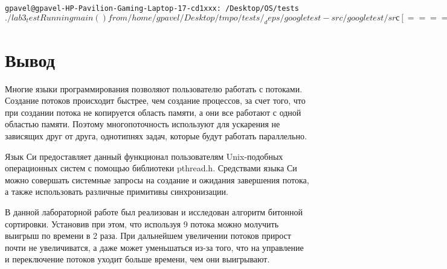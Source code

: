 \documentclass[pdf, unicode, 12pt, a4paper,oneside,fleqn]{article}
\begin{document}
\begin{alltt}
gpavel@gpavel-HP-Pavilion-Gaming-Laptop-17-cd1xxx:~/Desktop/OS/tests$ ./lab3_test
Running main() from /home/gpavel/Desktop/tmpo/tests/_deps/googletest-src/googletest/srс
[==========] Running 3 tests from 2 test suites.
[----------] Global test environment set-up.
[----------] 2 tests from ThirdLabTests
[ RUN      ] ThirdLabTests.IncorrectNumberOfThreads
ERROR: Incorrect number of threads
ERROR: Incorrect number of threads
Passed the test for incorrect input of the number of threads
[       OK ] ThirdLabTests.IncorrectNumberOfThreads (0 ms)
[ RUN      ] ThirdLabTests.SingleThread
Array is sorted
[       OK ] ThirdLabTests.SingleThread (1085 ms)
[----------] 2 tests from ThirdLabTests (1085 ms total)
[----------] 1 test from ThirdLabTest
[ RUN      ] ThirdLabTest.MultiThreads
Max thread count is 2
Array is sorted
Runtime is 604 ms

Max thread count is 3
Array is sorted
Runtime is 581 ms

Max thread count is 4
Array is sorted
Runtime is 567 ms

Max thread count is 5
Array is sorted
Runtime is 536 ms

7Max thread count is 6
Array is sorted
Runtime is 555 ms

Max thread count is 7
Array is sorted
Runtime is 551 ms

Max thread count is 8
Array is sorted
Runtime is 421 ms

Max thread count is 9
Array is sorted
Runtime is 362 ms
[       OK ] ThirdLabTest.MultiThreads (4182 ms)
[----------] 1 test from ThirdLabTest (4182 ms total)
[----------] Global test environment tear-down
[==========] 3 tests from 2 test suites ran. (5267 ms total)
[ PASSED ] 3 tests.
gpavel@gpavel-HP-Pavilion-Gaming-Laptop-17-cd1xxx:~/Desktop/OS/tests$
\end{alltt}
\pagebreak

\section{Вывод}

Многие языки программирования позволяют пользователю работать с потоками. 
Создание потоков происходит быстрее, чем создание процессов, за счет того, что
при создании потока не копируется область памяти, а они все работают с одной
областью памяти. Поэтому многопоточность используют для ускарения не зависящих
друг от друга, однотипнях задач, которые будут работать параллельно.

Язык Си предоставляет данный функционал пользователям Unix-подобных операционных
систем с помощью библиотеки pthread.h. Средствами языка Си можно совершать системные
запросы на создание и ожидания завершения потока, а также использовать различные
примитивы синхронизации.

В данной лабораторной работе был реализован и исследован алгоритм битонной сортировки.
Установив при этом, что используя 9 потока можно молучить выигрыш по времени
в 2 раза. При дальнейшем увеличении потоков прирост почти не увеличиватся, а
даже может уменьшаться из-за того, что на управление и переключение потоков 
уходит больше времени, чем они выигрывают.
\end{document}
